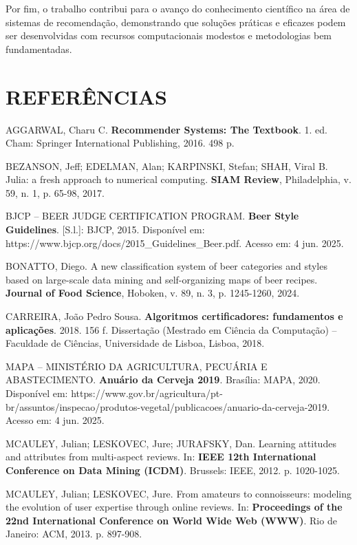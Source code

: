 \documentclass[12pt,a4paper]{article}
\begin{document}
Por fim, o trabalho contribui para o avanço do conhecimento científico na área de sistemas de recomendação, demonstrando que soluções práticas e eficazes podem ser desenvolvidas com recursos computacionais modestos e metodologias bem fundamentadas.

\newpage
\section{REFERÊNCIAS}

\begin{thebibliography}{20}

AGGARWAL, Charu C. \textbf{Recommender Systems: The Textbook}. 1. ed. Cham: Springer International Publishing, 2016. 498 p.

BEZANSON, Jeff; EDELMAN, Alan; KARPINSKI, Stefan; SHAH, Viral B. Julia: a fresh approach to numerical computing. \textbf{SIAM Review}, Philadelphia, v. 59, n. 1, p. 65-98, 2017.

BJCP -- BEER JUDGE CERTIFICATION PROGRAM. \textbf{Beer Style Guidelines}. [S.l.]: BJCP, 2015. Disponível em: https://www.bjcp.org/docs/2015\_Guidelines\_Beer.pdf. Acesso em: 4 jun. 2025.

BONATTO, Diego. A new classification system of beer categories and styles based on large-scale data mining and self-organizing maps of beer recipes. \textbf{Journal of Food Science}, Hoboken, v. 89, n. 3, p. 1245-1260, 2024.

CARREIRA, João Pedro Sousa. \textbf{Algoritmos certificadores: fundamentos e aplicações}. 2018. 156 f. Dissertação (Mestrado em Ciência da Computação) -- Faculdade de Ciências, Universidade de Lisboa, Lisboa, 2018.

MAPA -- MINISTÉRIO DA AGRICULTURA, PECUÁRIA E ABASTECIMENTO. \textbf{Anuário da Cerveja 2019}. Brasília: MAPA, 2020. Disponível em: https://www.gov.br/agricultura/pt-br/assuntos/inspecao/produtos-vegetal/publicacoes/anuario-da-cerveja-2019. Acesso em: 4 jun. 2025.

MCAULEY, Julian; LESKOVEC, Jure; JURAFSKY, Dan. Learning attitudes and attributes from multi-aspect reviews. In: \textbf{IEEE 12th International Conference on Data Mining (ICDM)}. Brussels: IEEE, 2012. p. 1020-1025.

MCAULEY, Julian; LESKOVEC, Jure. From amateurs to connoisseurs: modeling the evolution of user expertise through online reviews. In: \textbf{Proceedings of the 22nd International Conference on World Wide Web (WWW)}. Rio de Janeiro: ACM, 2013. p. 897-908.


\end{thebibliography}
\end{document}
